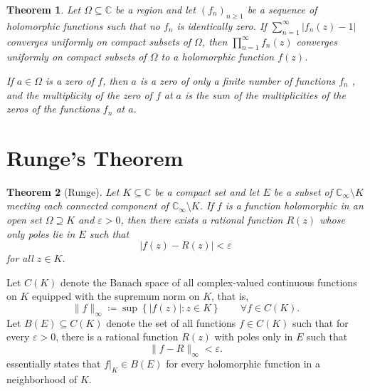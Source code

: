 \documentclass[11pt]{article}
\theoremstyle{thmstyle}
\newtheorem{theorem}{Theorem}[section]
\theoremstyle{defstyle}
\newcommand{\bbC}{\mathbb{C}}
\renewcommand{\ge}{\geqslant}
\begin{document}
\begin{theorem}
    Let $\Omega\subseteq\bbC$ be a region and let $(f_n)_{n\ge 1}$ be a sequence of holomorphic functions such that no $f_n$ is identically zero. If $\displaystyle\sum_{n = 1}^\infty |f_n(z) - 1|$ converges uniformly on compact subsets of $\Omega$, then $\displaystyle\prod_{n = 1}^\infty f_n(z)$ converges uniformly on compact subsets of $\Omega$ to a holomorphic function $f(z)$.

    If $a\in\Omega$ is a zero of $f$, then $a$ is a zero of only a finite number of functions $f_n$ , and the multiplicity of the zero of $f$ at $a$ is the sum of the multiplicities of the zeros of the functions $f_n$ at $a$.
\end{theorem}

\section{Runge's Theorem}

\begin{theorem}[Runge]
    Let $K\subseteq\bbC$ be a compact set and let $E$ be a subset of $\bbC_\infty\setminus K$ meeting each connected component of $\bbC_\infty\setminus K$. If $f$ is a function holomorphic in an open set $\Omega\supseteq K$ and $\varepsilon > 0$, then there exists a rational function $R(z)$ whose only poles lie in $E$ such that 
    \begin{equation*}
        |f(z) - R(z)| < \varepsilon
    \end{equation*}
    for all $z\in K$.
\end{theorem}

Let $C(K)$ denote the Banach space of all complex-valued continuous functions on $K$ equipped with the supremum norm on $K$, that is, 
\begin{equation*}
    \|f\|_\infty\coloneq\sup\left\{|f(z)|\colon z\in K\right\}\qquad\forall f\in C(K).
\end{equation*}
Let $B(E)\subseteq C(K)$ denote the set of all functions $f\in C(K)$ such that for every $\varepsilon > 0$, there is a rational function $R(z)$ with poles only in $E$ such that 
\begin{equation*}
    \|f - R\|_\infty < \varepsilon.
\end{equation*}
 essentially states that $f|_K\in B(E)$ for every holomorphic function in a neighborhood of $K$.
\end{document}
